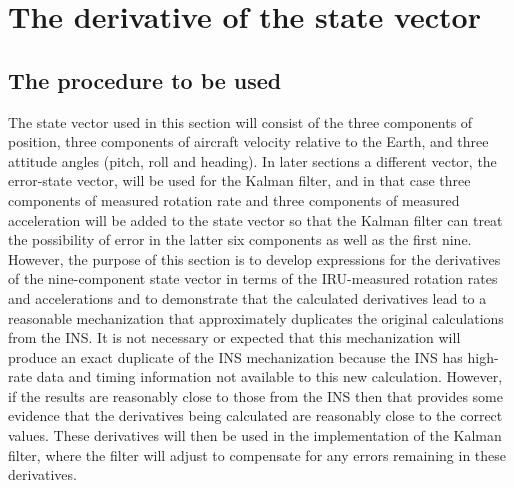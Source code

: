 \documentclass[12pt,twoside,english,12pt,twoside,english]{article}\usepackage[]{graphicx}\usepackage[]{color}
\let\stdsection\section
\renewcommand{\section}{\newpage\stdsection}
\let\OrgIndex\index
\renewcommand*{\index}[1]{\OrgIndex{#1}}
\begin{document}
\section{The derivative of the state vector}

\subsection{The procedure to be used\label{subsec:mech-procedures}}

 The state vector
used in this section will consist of the three components of position,
three components of aircraft velocity
relative to the Earth, and three attitude angles (pitch, roll and
heading). In later sections a different vector,
the error-state vector, will be used for
the Kalman filter, and in that case three components
of measured rotation rate
and three components of measured acceleration
 will be added to the state vector so that the
Kalman filter can treat the possibility of error in the latter six
components as well as the first nine. However, the purpose of this
section is to develop expressions for the derivatives of the nine-component
state vector in terms of the IRU-measured
rotation rates and accelerations
and to demonstrate that the calculated derivatives lead to a reasonable
mechanization that approximately duplicates
the original calculations from the INS. It is not necessary or expected
that this mechanization will produce an exact duplicate of the INS
mechanization because the INS has high-rate data and timing information
not available to this new calculation. However, if the results are
reasonably close to those from the INS then that provides some evidence
that the derivatives being calculated are reasonably close to the
correct values. These derivatives will then be used in the implementation
of the Kalman filter, where the filter will adjust to compensate for
any errors remaining in these derivatives. 
\end{document}
